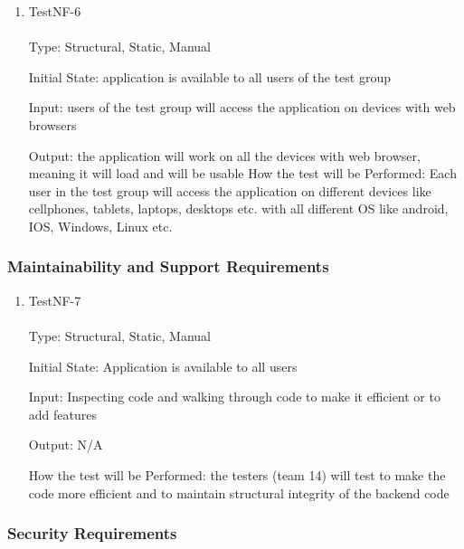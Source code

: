 \documentclass[12pt, titlepage]{article}
\begin{document}
\begin{enumerate}

\item{TestNF-6\\\\}
Type: Structural, Static, Manual

Initial State: application is available to all users of the test group

Input: users of the test group will access the application on devices with web browsers

Output: the application will work on all the devices with web browser, meaning it will load and will be usable 
How the test will be Performed: Each user in the test group will access the application on different devices like cellphones, tablets, laptops, desktops etc. with all different OS like android, IOS, Windows, Linux etc. 

\end{enumerate}

\subsubsection{Maintainability and Support Requirements}


\begin{enumerate}

\item{TestNF-7\\\\}
Type: Structural, Static, Manual

Initial State: Application is available to all users

Input: Inspecting code and walking through code to make it efficient or to add features

Output: N/A

How the test will be Performed: the testers (team 14) will test to make the code more efficient and to maintain structural integrity of the backend code

\end{enumerate}

\subsubsection{Security Requirements}
\end{document}
